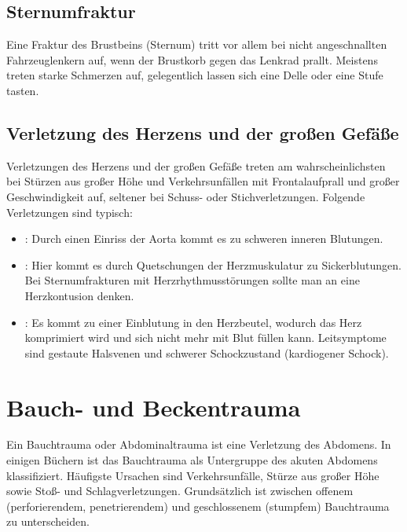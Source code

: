 \subsection{Sternumfraktur}\label{topic:sternumfraktur}
Eine Fraktur des Brustbeins (Sternum) tritt vor allem bei nicht angeschnallten
Fahrzeuglenkern auf, wenn der Brustkorb gegen das Lenkrad prallt. Meistens treten
starke Schmerzen auf, gelegentlich lassen sich eine Delle oder eine Stufe tasten.

\subsection{Verletzung des Herzens und der großen Gefäße}
Verletzungen des Herzens und der großen Gefäße treten am wahrscheinlichsten bei
Stürzen aus großer Höhe und Verkehrsunfällen mit Frontalaufprall und großer
Geschwindigkeit auf, seltener bei Schuss- oder Stichverletzungen. Folgende
Verletzungen sind typisch:

\begin{itemize}
  \item {}: Durch einen Einriss der Aorta kommt es zu schweren inneren Blutungen.
  \item {}: Hier kommt es durch Quetschungen der Herzmuskulatur
  zu Sickerblutungen. Bei Sternumfrakturen mit Herzrhythmusstörungen sollte man
  an eine Herzkontusion denken.
  \item {}: Es kommt zu einer Einblutung in den
  Herzbeutel,  wodurch das Herz komprimiert wird und sich nicht mehr mit Blut
  füllen  kann. Leitsymptome sind gestaute Halsvenen und schwerer Schockzustand
  (kardiogener Schock).
\end{itemize}

\section{Bauch- und Beckentrauma}

Ein Bauchtrauma oder Abdominaltrauma ist eine Verletzung des Abdomens. In einigen
Büchern ist das Bauchtrauma als Untergruppe des akuten Abdomens klassifiziert.
Häufigste Ursachen sind Verkehrsunfälle, Stürze aus großer Höhe sowie Stoß- und
Schlagverletzungen. \cite{RedelsteinerHRNS1} Grundsätzlich ist zwischen offenem
(perforierendem, penetrierendem) und geschlossenem (stumpfem) Bauchtrauma zu
unterscheiden.

